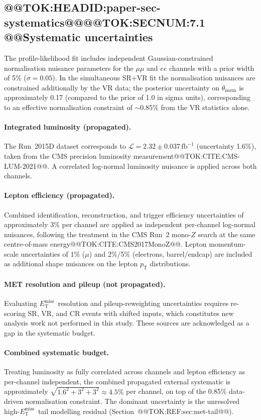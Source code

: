 \documentclass[11pt]{article}
\newcommand{\MET}{\ensuremath{E_{\mathrm{T}}^{\mathrm{miss}}}}
\begin{document}
\subsection{@@TOK:HEADID:paper-sec-systematics@@@@TOK:SECNUM:7.1 @@Systematic uncertainties}
The profile-likelihood fit includes independent Gaussian-constrained
normalisation nuisance parameters for the $\mu\mu$ and $ee$ channels
with a prior width of 5\% ($\sigma=0.05$).
In the simultaneous SR+VR fit the normalisation nuisances are
constrained additionally by the VR data; the posterior uncertainty on
$\theta_{\mathrm{norm}}$ is approximately 0.17 (compared to the prior
of 1.0 in sigma units), corresponding to an effective normalisation
constraint of $\sim$0.85\% from the VR statistics alone.

\paragraph{Integrated luminosity (propagated).}
The Run~2015D dataset corresponds to
$\mathcal{L}=2.32\pm0.037\,\mathrm{fb}^{-1}$ (uncertainty 1.6\%),
taken from the CMS precision luminosity measurement@@TOK:CITE:CMS-LUM-2021@@.
A correlated log-normal luminosity nuisance is applied across both channels.

\paragraph{Lepton efficiency (propagated).}
Combined identification, reconstruction, and trigger efficiency
uncertainties of approximately 3\% per channel are applied as
independent per-channel log-normal nuisances, following the treatment
in the CMS Run~2 mono-$Z$ search at the same centre-of-mass
energy@@TOK:CITE:CMS2017MonoZ@@. Lepton momentum-scale uncertainties of 1\%
($\mu$) and 2\%/5\% (electrons, barrel/endcap) are included as additional
shape nuisances on the lepton $p_{\mathrm{T}}$ distributions.

\paragraph{MET resolution and pileup (not propagated).}
Evaluating \MET\ resolution and pileup-reweighting uncertainties
requires re-scoring SR, VR, and CR events with shifted inputs, which
constitutes new analysis work not performed in this study. These
sources are acknowledged as a gap in the systematic budget.

\paragraph{Combined systematic budget.}
Treating luminosity as fully correlated across channels and lepton
efficiency as per-channel independent, the combined propagated external
systematic is approximately $\sqrt{1.6^2+3^2+3^2}\approx4.5\%$ per
channel, on top of the 0.85\% data-driven normalisation constraint.
The dominant uncertainty is the unresolved high-\MET\ tail modelling
residual (Section~@@TOK:REF:sec:met-tail@@).
\end{document}
